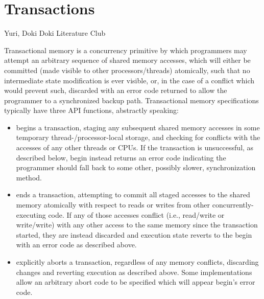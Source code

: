 \chapter{Transactions}
\label{chap:tm}


{Yuri, Doki Doki Literature Club}

Transactional memory  is a concurrency primitive
by which programmers may attempt an arbitrary sequence of shared memory accesses,
which will either be committed (made visible to other processors/threads) atomically,
such that no intermediate state modification is ever visible,
or, in the case of a conflict which would prevent such,
discarded with an error code returned to allow the programmer to  a synchronized backup path.
%
Transactional memory specifications typically have three API functions, abstractly speaking:
\begin{itemize}
	\item  {\sf {}} begins a transaction,
		staging any subsequent shared memory accesses in some temporary thread-/processor-local storage,
		and checking for conflicts with the accesses of any other threads or CPUs.
		If the transaction is unsuccessful, as described below,
		{\sf begin} instead returns an error code
		indicating the programmer should fall back to some other, possibly slower, synchronization method.
	\item {\sf {}} ends a transaction,
		attempting to commit all staged accesses to the shared memory atomically with respect to
		reads or writes from other concurrently-executing code.
		If any of those accesses conflict (i.e., read/write or write/write)
		with any other access to the same memory since the transaction started,
		they are instead discarded and execution state reverts to the {\sf begin} with an error code as described above.
	\item {\sf {}} explicitly aborts a transaction,
		regardless of any memory conflicts,
		discarding changes and reverting execution as described above.
		Some implementations allow an arbitrary abort code to be specified
		which will appear  {\sf begin}'s error code.
\end{itemize}

